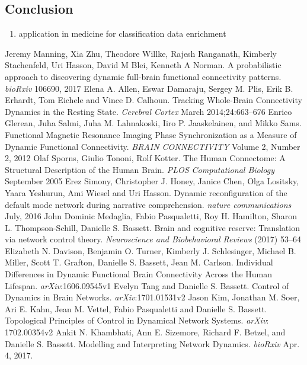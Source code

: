 \documentclass[12pt]{article}
\begin{document}
\subsection{Conclusion}
\begin{enumerate}
\item application in medicine for classification data enrichment
\end{enumerate}
\begin{thebibliography}{1}
 Jeremy Manning, Xia Zhu, Theodore Willke, Rajesh Ranganath, Kimberly Stachenfeld, Uri Hasson, David M Blei, Kenneth A Norman. A probabilistic approach to discovering dynamic full-brain functional connectivity patterns. \textit{bioRxiv} 106690, 2017
 Elena A. Allen, Eswar Damaraju, Sergey M. Plis, Erik B. Erhardt, Tom Eichele and Vince D. Calhoun. Tracking Whole-Brain Connectivity Dynamics in the Resting State. \textit{Cerebral Cortex} March 2014;24:663–676
 Enrico Glerean, Juha Salmi, Juha M. Lahnakoski, Iiro P. Jaaskelainen, and Mikko Sams. Functional Magnetic Resonance Imaging Phase Synchronization as a Measure of Dynamic Functional Connectivity. \textit{BRAIN CONNECTIVITY} Volume 2, Number 2, 2012
 Olaf Sporns, Giulio Tononi, Rolf Kotter. The Human Connectome: A Structural Description of the Human Brain. \textit{PLOS Computational Biology} September 2005
 Erez Simony, Christopher J. Honey, Janice Chen, Olga Lositsky, Yaara Yeshurun, Ami Wiesel and Uri Hasson. Dynamic reconfiguration of the default mode network during narrative comprehension. \textit{nature communications} July, 2016
 John Dominic Medaglia, Fabio Pasqualetti, Roy H. Hamilton, Sharon L. Thompson-Schill, Danielle S. Bassett. Brain and cognitive reserve: Translation via network control theory. \textit{Neuroscience and Biobehavioral Reviews} (2017) 53–64
 Elizabeth N. Davison, Benjamin O. Turner, Kimberly J. Schlesinger, Michael B. Miller, Scott T. Grafton, Danielle S. Bassett, Jean M. Carlson. Individual Differences in Dynamic Functional Brain Connectivity Across the Human Lifespan. \textit{arXiv}:1606.09545v1
 Evelyn Tang and Danielle S. Bassett. Control of Dynamics in Brain Networks. \textit{arXiv}:1701.01531v2
 Jason Kim, Jonathan M. Soer, Ari E. Kahn, Jean M. Vettel, Fabio Pasqualetti and Danielle S. Bassett. Topological Principles of Control in Dynamical Network Systems. \textit{arXiv}: 1702.00354v2
 Ankit N. Khambhati, Ann E. Sizemore, Richard F. Betzel, and Danielle S. Bassett. Modelling and Interpreting Network Dynamics. \textit{bioRxiv} Apr. 4, 2017.

\end{thebibliography}
\end{document}
